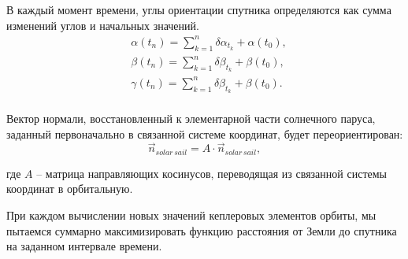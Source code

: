     В каждый момент времени, углы ориентации спутника определяются как сумма
изменений углов и начальных значений.
\begin{equation}
    \begin{aligned}
        &\alpha(t_n) = \sum\limits_{k=1}^{n}\delta\alpha_{t_k} + \alpha(t_{0}), \\
        &\beta(t_n) = \sum\limits_{k=1}^{n}\delta\beta_{t_k} + \beta(t_{0}), \\
        &\gamma(t_n) = \sum\limits_{k=1}^{n}\delta\beta_{t_k} + \beta(t_{0}). \\
    \end{aligned}
\end{equation}\par
    Вектор нормали, восстановленный к элементарной части солнечного паруса, заданный
первоначально в связанной системе координат, будет переориентирован:
\begin{equation}
    \vec{n}_{solar\, sail} = A \cdot \vec{n}_{solar\, sail},
\end{equation}\par
    где $A$ -- матрица направляющих косинусов, переводящая из связанной системы
координат в орбитальную.\par
    При каждом вычислении новых значений кеплеровых элементов орбиты, мы пытаемся
суммарно максимизировать функцию расстояния от Земли до спутника на заданном интервале
времени.\par
